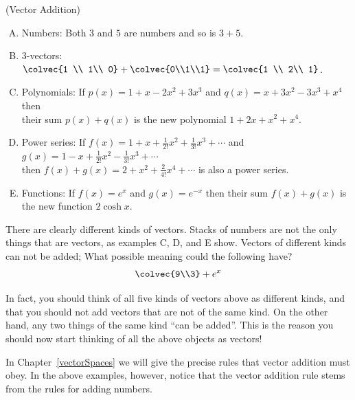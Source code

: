 \begin{example} (Vector Addition)
\begin{enumerate}[(A)]
\item Numbers: Both $3$ and $5$ are numbers and so is $3+5$.\\[-2mm]
\item 3-vectors: $\colvec{1 \\ 1\\ 0} + \colvec{0\\1\\1}=\colvec{1 \\ 2\\ 1}$.\\[-1mm]
\item Polynomials: If $p(x)=1+x-2x^2+3x^3$ and $q(x)=x+3x^2-3x^3+x^4$ then\\[1mm] their sum $p(x)+q(x)$ is the new polynomial $1+2x+x^2+x^4$.\\
\item Power series: If $f(x)=1+x+\frac1{2!} x^2 + \frac1{3!} x^3 +\cdots$ and $g(x)=1-x+\frac1{2!} x^2 - \frac1{3!} x^3 +\cdots$ \\[1mm]
 then $f(x)+g(x)=2+ x^2 +\frac2 {4!} x^4+\cdots$ is also a power series.\\
\item Functions: If $f(x)=e^x$ and $g(x)=e^{-x}$ then their sum $f(x)+g(x)$ is the new function $2\cosh x$.
\end{enumerate}
\end{example}

\noindent
There are clearly different kinds of vectors. 
Stacks of numbers are not the only things that are vectors, as examples C, D, and E show. 
Vectors of different kinds can not be added; What possible meaning could the following have? 
$$\colvec{9\\3} + e^x$$

In fact, you should think of all five kinds of vectors above as different kinds, and that you should not add vectors that are not of the same kind. 
On the other hand, any two things of the same kind ``can be added''. 
This is the reason you should now start thinking of all the above objects as vectors! 

In Chapter~\ref{vectorSpaces} we will give the precise rules that  vector addition must obey. 
In the above examples, however, notice that the vector addition rule stems from the rules for adding numbers. 
 

